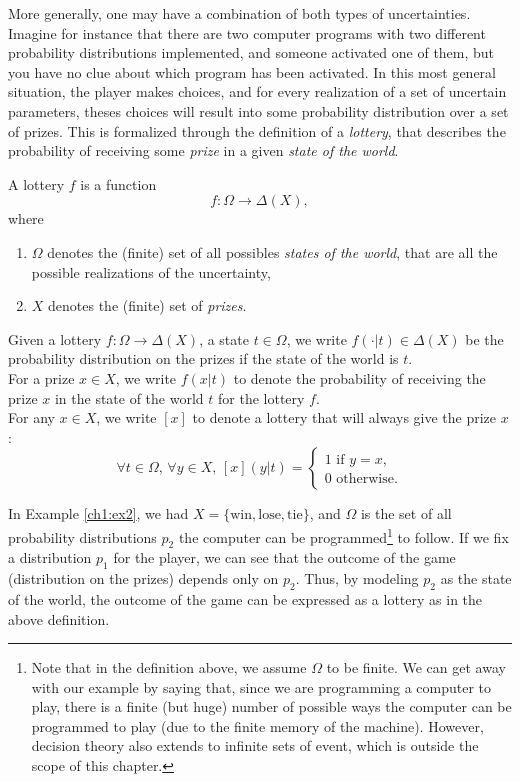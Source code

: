 More generally, one may have a combination of both types of uncertainties.
Imagine for instance that there are two computer programs with two different probability distributions implemented,
and someone activated one of them, but you have no clue about which program has been activated.
In this most general situation, the player makes choices, and for every realization of a set of uncertain parameters,
theses choices will result into some probability distribution over a set of prizes.
This is formalized through the definition of a \emph{lottery},  that describes the probability of receiving some \emph{prize} in a given \emph{state of the world}.

\begin{definition}[Lottery]
\label{ch1:def1:lottery}
A lottery $f$ is a function
$$ f : \Omega \rightarrow \Delta(X), $$
where
\begin{enumerate}
\item $\Omega$  denotes the (finite) set of all possibles \emph{states of the world}, that are all the possible realizations of the uncertainty,
\item $X$ denotes the (finite) set of \emph{prizes}.
\end{enumerate}
\end{definition}
\begin{notation}[$f(\cdot | t), \, f(x | t)$]
Given a lottery $f : \Omega \rightarrow \Delta(X)$, a state $t \in \Omega$, we write $f(\cdot | t) \in \Delta(X)$ be the probability distribution on the prizes if the state of the world is $t$.\\ For a prize $x \in X$, we write $f(x|t)$ to denote the probability of receiving the prize $x$ in the state of the world $t$ for the lottery $f$.\\
For any $x \in X$, we write $[x]$ to denote a lottery that will always give the prize $x$:
$$ \forall t \in \Omega, \, \forall y \in X, \, [x](y|t) =
\begin{cases}
1 \text{ if } y = x,\\
0 \text{ otherwise.}
\end{cases} $$
\end{notation}
In Example \ref{ch1:ex2}, we had $X = \{\text{win}, \text{lose}, \text{tie} \}$,
and $\Omega$ is the set of all probability distributions $p_2$ the computer can be programmed\footnote{Note that in the definition above, we assume $\Omega$ to be finite. We can get away with our example by saying that, since we are programming a computer to play, there is  a finite (but huge) number of possible ways the computer can be programmed to play (due to the finite memory of the machine). However, decision theory also extends to infinite sets of event, which is outside the scope of this chapter.} to follow.  If we fix a distribution $p_1$ for the player, we can see that the outcome of the game (distribution on the prizes) depends only on $p_2$.
Thus, by modeling $p_2$ as the state of the world, the outcome of the game can be expressed as a lottery as in the above definition.


